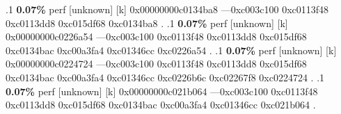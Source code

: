 \begin{profile}
{.1 \textbf{ 0.07\%} perf             [unknown]              [k] 0x00000000c0134ba8\newline {} ---0xc003c100\newline {} 0xc0113f48\newline {} 0xc0113dd8\newline {} 0xc015df68\newline {} 0xc0134ba8\newline {} . 
.1 \textbf{ 0.07\%} perf             [unknown]              [k] 0x00000000c0226a54\newline {} ---0xc003c100\newline {} 0xc0113f48\newline {} 0xc0113dd8\newline {} 0xc015df68\newline {} 0xc0134bac\newline {} 0xc00a3fa4\newline {} 0xc01346cc\newline {} 0xc0226a54\newline {} . 
.1 \textbf{ 0.07\%} perf             [unknown]              [k] 0x00000000c0224724\newline {} ---0xc003c100\newline {} 0xc0113f48\newline {} 0xc0113dd8\newline {} 0xc015df68\newline {} 0xc0134bac\newline {} 0xc00a3fa4\newline {} 0xc01346cc\newline {} 0xc0226b6c\newline {} 0xc02267f8\newline {} 0xc0224724\newline {} . 
.1 \textbf{ 0.07\%} perf             [unknown]              [k] 0x00000000c021b064\newline {} ---0xc003c100\newline {} 0xc0113f48\newline {} 0xc0113dd8\newline {} 0xc015df68\newline {} 0xc0134bac\newline {} 0xc00a3fa4\newline {} 0xc01346cc\newline {} 0xc021b064\newline {} . 
}
\end{profile}
